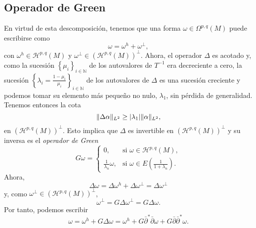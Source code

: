 \documentclass[12pt,a4paper]{article}
\theoremstyle{definition} \newtheorem{defn}[thm]{Definición}
\theoremstyle{definition} \newtheorem{ejemplo}[thm]{Ejemplo}
\theoremstyle{definition} \newtheorem{ejercicio}[thm]{Ejercicio}
\theoremstyle{remark} \newtheorem*{obs}{Observación}
\DeclarePairedDelimiter\norm{\lVert}{\rVert}
\newcommand{\dol}{\bar{\partial}}
\newcommand{\NN}{\mathbb{N}}
\begin{document}
    \subsection{Operador de Green}
    En virtud de esta descomposición, tenemos que una forma $\omega \in \Omega^{p,q}(M)$ puede escribirse como 
    \begin{equation*}
      \omega=\omega^h + \omega^{\perp},
    \end{equation*}
    con $\omega^h\in \mathcal{H}^{p,q}(M)$ y $\omega^{\perp} \in (\mathcal{H}^{p,q}(M))^{\perp}$. Ahora, el operador $\Delta$ es acotado y, como la sucesión $\left\{ \mu_i \right\}_{i\in \NN}$ de los autovalores de $T^{-1}$ era decreciente a cero, la sucesión $\left\{ \lambda_i=\frac{1-\mu_i}{\mu_i} \right\}_{i\in \NN}$ de los autovalores de $\Delta$ es una sucesión creciente y podemos tomar su elemento más pequeño no nulo, $\lambda_1$, sin pérdida de generalidad. Tenemos entonces la cota
    \begin{equation*}
      \norm{\Delta \alpha}_{L^2} \geq |\lambda_1| \norm{\alpha}_{L^2},
    \end{equation*}
    en $(\mathcal{H}^{p,q}(M))^{\perp}$.
    Esto implica que $\Delta$ es invertible en $(\mathcal{H}^{p,q}(M))^{\perp}$ y su inversa es el \emph{operador de Green}
    \begin{equation*}
      G\omega = 
      \begin{cases}
	0, & \text{si } \omega \in \mathcal{H}^{p,q}(M), \\
	\frac{1}{\lambda_n}\omega, & \text{si } \omega \in E(\frac{1}{1+\lambda_n}).
      \end{cases}
    \end{equation*}
    Ahora,
    \begin{equation*}
      \Delta \omega = \Delta \omega^h + \Delta \omega^\perp = \Delta \omega^\perp
    \end{equation*}
    y, como $\omega^\perp \in (\mathcal{H}^{p,q}(M))^{\perp}$, 
    \begin{equation*}
      \omega^\perp=G\Delta \omega^\perp=G \Delta \omega.
    \end{equation*}
    Por tanto, podemos escribir
    \begin{equation*}
      \omega = \omega^h + G\Delta \omega = \omega^h + G\dol^*\dol\omega + G\dol \dol^*\omega.
    \end{equation*}
    
\end{document}
